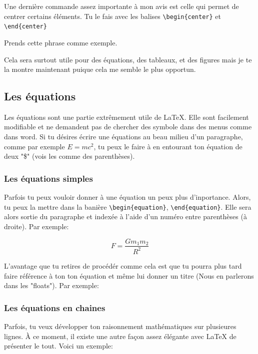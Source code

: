 \documentclass[a4paper, 10pt]{article}
\begin{document}
Une dernière commande assez importante à mon avis est celle qui permet de
centrer certains éléments. Tu le fais avec les balises \verb+\begin{center}+
et \verb+\end{center}+

\begin{center}
Prends cette phrase comme exemple.
\end{center}

Cela sera surtout utile pour des équations, des tableaux, et des figures
mais je te la montre maintenant puique cela me semble le plus opportun.

\subsection{Les équations}

Les équations sont une partie extrêmement utile de \LaTeX.
Elle sont facilement modifiable et ne demandent pas de chercher des symbole
dans des menus comme dans word. Si tu désires écrire une équations
au beau milieu d'un paragraphe, comme par exemple $E=mc^2$, tu peux le faire
à en entourant ton équation de deux "\$" (vois les comme des parenthèses).

\subsubsection{Les équations simples}
Parfois tu peux vouloir donner à une équation un peux plus d'inportance.
Alors, tu peux la mettre dans la banière \verb+\begin{equation}+,
\verb+\end{equation}+. Elle sera alors sortie du paragraphe et indexée
à l'aide d'un numéro entre parenthèses (à droite). Par exemple:

\begin{equation}
  F = \dfrac{ G m_1 m_2 }{ R^2 }
\end{equation}

L'avantage que tu retires de procédér comme cela est que tu pourra
plus tard faire référence à ton ton équation et même lui donner un
titre (Nous en parlerons dans les "floats"). Par exemple:

\subsubsection{Les équations en chaines}
Parfois, tu veux développer ton raisonnement mathématiques sur plusieures
lignes. À ce moment, il existe une autre façon assez élégante avec \LaTeX
de présenter le tout. Voici un exemple:
\end{document}
